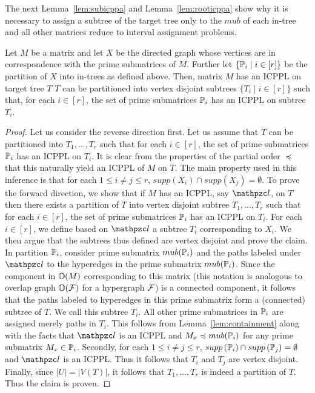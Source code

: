 The next Lemma~\ref{lem:subicppa} and Lemma~\ref{lem:rooticppa} show why it
is necessary to assign a subtree of the target tree only to the $mub$
of each in-tree and all other matrices reduce to interval assignment
problems.




\begin{lemma}
  \label{lem:subicppa}
  Let $M$ be a matrix and let $X$ be the directed graph whose vertices
  are in correspondence with the prime submatrices of $M$.  Further
  let $\{\mathbb P_i \mid i \in [r]\}$ be the partition of $X$ into in-trees
  as defined above.  Then, matrix $M$ has an ICPPL on target tree $T$
  \iff $T$ can be partitioned into vertex disjoint subtrees $\{T_i
  \mid i \in [r]\}$ such that, for each $i \in [r]$, the set of prime
  submatrices $\mathbb P_i$ has an ICPPL on subtree $T_i$.
\end{lemma}
\begin{proof}\thesisspacing
  Let us consider the reverse direction first.  Let us assume that $T$
  can be partitioned into $T_1, \ldots, T_r$ such that for each $i \in
  [r]$, the set of prime submatrices $\mathbb P_i$ has an ICPPL on $T_i$.
  It is clear from the properties of the partial order $\preccurlyeq$
  that this naturally yield an ICPPL of $M$ on $T$.  The main property
  used in this inference is that for each $1 \leq i \neq j \leq r$,
  $supp(X_i) \cap supp(X_j) = \emptyset$.  To prove the forward
  direction, we show that if $M$ has an ICPPL, say $\cl$, on $T$ then
  there exists a partition of $T$ into vertex disjoint subtree $T_1,
  \ldots, T_r$ such that for each $i \in [r]$, the set of prime
  submatrices $\mathbb P_i$ has an ICPPL on $T_i$.  For each $i \in [r]$, we
  define based on $\cl$ a subtree $T_i$ corresponding to $X_i$.  We
  then argue that the subtrees thus defined are vertex disjoint and
  prove the claim.  In partition $\mathbb P_i$, consider prime submatrix
  $mub(\mathbb P_i)$ and the paths labeled under $\cl$ to the hyperedges in
  the prime submatrix $mub(\mathbb P_i)$.  Since the component in $\mathbb O(M)$
  corresponding to this matrix (this notation is analogous to overlap
  graph $\mathbb O({\cal F})$ for a hypergraph ${\cal F}$) is a connected component,
  it follows that the paths labeled to hyperedges in this prime
  submatrix form a (connected) subtree of $T$.  We call this subtree
  $T_i$.  All other prime submatrices in $\mathbb P_i$ are assigned merely
  paths in $T_i$. This follows from Lemma~\ref{lem:containment} along
  with the facts that $\cl$ is an ICPPL and $M_x \preccurlyeq
  mub(\mathbb P_i)$ for any prime submatrix $M_x \in \mathbb P_i$.  Secondly, for
  each $1 \leq i \neq j \leq r$, $supp\left(\mathbb P_i\right) \cap supp\left(\mathbb P_j\right) =
  \emptyset$ and $\cl$ is an ICPPL. Thus it follows that $T_i$ and
  $T_j$ are vertex disjoint.  Finally, since $|U| = |V(T)|$, it
  follows that $T_1, \ldots, T_r$ is indeed a partition of $T$. Thus
  the claim is proven.
\end{proof}

